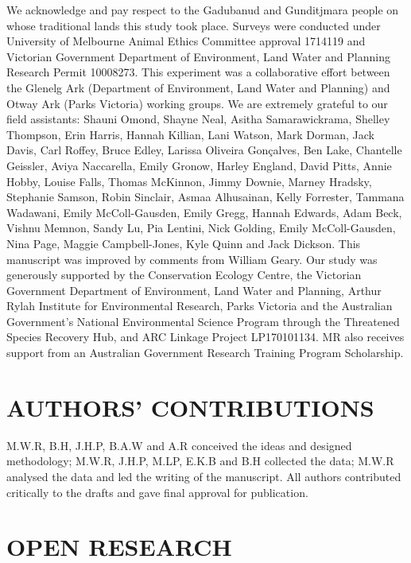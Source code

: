 \documentclass[]{elsarticle} %
\begin{document}
We acknowledge and pay respect to the Gadubanud and Gunditjmara people on whose traditional lands this study took place. Surveys were conducted under University of Melbourne Animal Ethics Committee approval 1714119 and Victorian Government Department of Environment, Land Water and Planning Research Permit 10008273. This experiment was a collaborative effort between the Glenelg Ark (Department of Environment, Land Water and Planning) and Otway Ark (Parks Victoria) working groups. We are extremely grateful to our field assistants: Shauni Omond, Shayne Neal, Asitha Samarawickrama, Shelley Thompson, Erin Harris, Hannah Killian, Lani Watson, Mark Dorman, Jack Davis, Carl Roffey, Bruce Edley, Larissa Oliveira Gonçalves, Ben Lake, Chantelle Geissler, Aviya Naccarella, Emily Gronow, Harley England, David Pitts, Annie Hobby, Louise Falls, Thomas McKinnon, Jimmy Downie, Marney Hradsky, Stephanie Samson, Robin Sinclair, Asmaa Alhusainan, Kelly Forrester, Tammana Wadawani, Emily McColl-Gausden, Emily Gregg, Hannah Edwards, Adam Beck, Vishnu Memnon, Sandy Lu, Pia Lentini, Nick Golding, Emily McColl-Gausden, Nina Page, Maggie Campbell-Jones, Kyle Quinn and Jack Dickson. This manuscript was improved by comments from William Geary. Our study was generously supported by the Conservation Ecology Centre, the Victorian Government Department of Environment, Land Water and Planning, Arthur Rylah Institute for Environmental Research, Parks Victoria and the Australian Government's National Environmental Science Program through the Threatened Species Recovery Hub, and ARC Linkage Project LP170101134. MR also receives support from an Australian Government Research Training Program Scholarship.

\hypertarget{authors-contributions}{%
\section{AUTHORS' CONTRIBUTIONS}\label{authors-contributions}}

M.W.R, B.H, J.H.P, B.A.W and A.R conceived the ideas and designed methodology; M.W.R, J.H.P, M.LP, E.K.B and B.H collected the data; M.W.R analysed the data and led the writing of the manuscript. All authors contributed critically to the drafts and gave final approval for publication.

\hypertarget{open-research}{%
\section{OPEN RESEARCH}\label{open-research}}
\end{document}
